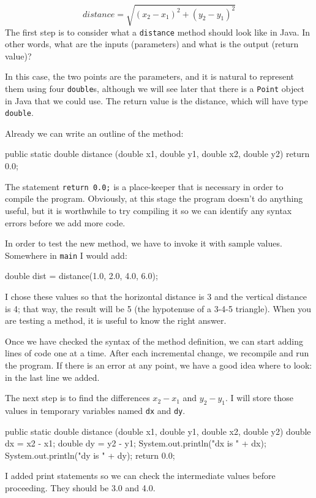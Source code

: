 \documentclass{book}
\begin{document}
\begin{equation}
distance = \sqrt{(x_2 - x_1)^2 +(y_2 - y_1)^2}
\end{equation}
%
The first step is to consider what a {\tt distance} method
should look like in Java.  In other words, what are the inputs
(parameters) and what is the output (return value)?

In this case, the two points are the parameters, and it is
natural to represent them using four {\tt double}s, although
we will see later that there is a {\tt Point} object in Java
that we could use.  The return value is the distance, which
will have type {\tt double}.

Already we can write an outline of the method:

\begin{verbatimtab}
  public static double distance
              (double x1, double y1, double x2, double y2) {
    return 0.0;
  }
\end{verbatimtab}
%
The statement {\tt return 0.0;} is a place-keeper that is necessary
in order to compile the program.  Obviously, at this stage the
program doesn't do anything useful, but it is worthwhile to
try compiling it so we can identify any syntax errors before
we add more code.

In order to test the new method, we have to invoke it with
sample values.  Somewhere in {\tt main} I would add:

\begin{verbatimtab}
    double dist = distance(1.0, 2.0, 4.0, 6.0);
\end{verbatimtab}
%
I chose these values so that the horizontal
distance is 3 and the vertical distance is 4; that way,
the result will be 5 (the hypotenuse of a 3-4-5 triangle).
When you are testing a method, it is useful to know the right
answer.

Once we have checked the syntax of the method definition, we
can start adding lines of code one at a time.  After each
incremental change, we recompile and run the program.  If there is
an error at any point, we have a good idea where to look:
in the last line we added.

The next step is to find the differences
$x_2 - x_1$ and $y_2 - y_1$.  I will store those values in
temporary variables named {\tt dx} and {\tt dy}.

\begin{verbatimtab}
  public static double distance
              (double x1, double y1, double x2, double y2) {
    double dx = x2 - x1;
    double dy = y2 - y1;
    System.out.println("dx is " + dx);
    System.out.println("dy is " + dy);
    return 0.0;
  }
\end{verbatimtab}
%
I added print statements so we can check the intermediate values
before proceeding.  They should be 3.0 and 4.0.
\end{document}

